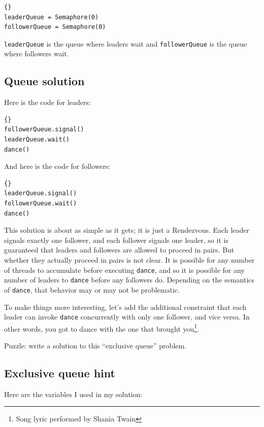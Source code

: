 \documentclass{book}
\newcommand{\clearemptydoublepage}{\newpage\cleardoublepage}
\begin{document}
\begin{lstlisting}[caption={Queue hint}]{}
leaderQueue = Semaphore(0)
followerQueue = Semaphore(0)
\end{lstlisting}

{\tt leaderQueue} is the queue where leaders wait 
and {\tt followerQueue} is the queue where followers wait.



\clearemptydoublepage
\subsection {Queue solution}

Here is the code for leaders:

\begin{lstlisting}[caption={Queue solution (leaders)}]{}
followerQueue.signal()
leaderQueue.wait()
dance()
\end{lstlisting}

And here is the code for followers:

\begin{lstlisting}[caption={Queue solution (followers)}]{}
leaderQueue.signal()
followerQueue.wait()
dance()
\end{lstlisting}

This solution is about as simple as it gets; it is just a Rendezvous.
Each leader signals exactly one follower, and each follower signals
one leader, so it is guaranteed that leaders and followers are
allowed to proceed in pairs.  But whether they actually proceed in
pairs is not clear.  It is possible for any number of threads to
accumulate before executing {\tt dance}, and so it is possible for
any number of leaders to {\tt dance} before any followers do.
Depending on the semantics of {\tt dance}, that behavior may or
may not be problematic.

To make things more interesting, let's add the additional constraint
that each leader can invoke {\tt dance} concurrently with only
one follower, and vice versa.  In other words, you got to dance
with the one that brought you\footnote{Song lyric performed by Shania
Twain}.

Puzzle: write a solution to this ``exclusive queue'' problem.

\clearemptydoublepage
\subsection {Exclusive queue hint}

Here are the variables I used in my solution:
\end{document}
